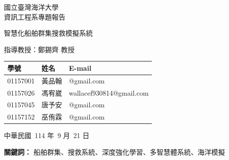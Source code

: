\documentclass[12pt,a4paper]{article}
\begin{document}
\begin{titlepage}

	\centering
	\vspace*{2cm}
	
	{\Large 國立臺灣海洋大學\\[0.5cm]資訊工程系專題報告 \par}
	
	\vspace*{1cm}
	{\Huge 智慧化船舶群集搜救模擬系統 \par}
	
	\vfill
	
	{\Large 指導教授：鄭錫齊 教授 \par}
	\vspace*{1cm}
	\begin{tabular}{lll}
	學號 & 姓名 & E-mail \\
	\hline
	01157001 & 黃品翰 & @gmail.com \\
	01157026 & 馮宥崴 & wallacef930814@gmail.com \\
	01157045 & 唐予安 & @gmail.com \\
	01157152 & 巫侑霖 & @gmail.com
	\end{tabular}

	\vspace*{1cm}
	{\Large 中華民國\ 114 年\ 9 月\ 21 日 \par}

\end{titlepage}

\vspace*{0.3\textheight}
\begin{abstract}
海上搜救任務面臨著範圍廣闊、海象險惡、時間緊迫等嚴峻挑戰。為應對此一難題，本專案建構了一套「智慧化船舶群集搜救模擬系統」。系統核心旨在模擬並最佳化真實的搜救作業流程：首先，依據目標可能區域進行高效的網格化分割；接著，指揮調度多艘船隻構成的搜救群集，對各區塊展開平行搜索，以最大化覆蓋率並縮短搜尋時間。我們在 Unity 與 Crest 物理引擎打造的擬真海洋環境中，採用 SAC 深度強化學習演算法，賦予每艘搜救船隻在複雜風浪中自主執行精密搜索路徑、並規避動態障礙物的能力。本專案旨在評估此 AI 驅動的搜救群集，在不同搜救情境下，對於提升目標發現成功率、縮短搜救時間的實際成效，為未來智慧化海上應急響應系統提供關鍵的模擬驗證。
\end{abstract}

\centerline{\textbf{關鍵詞：} 船舶群集、搜救系統、深度強化學習、多智慧體系統、海洋模擬}

\newpage

\tableofcontents
\newpage
\end{document}
